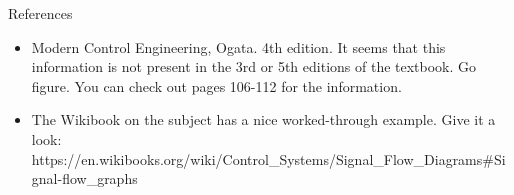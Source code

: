 \documentclass{../templates/topic}
\begin{document}
\begin{section}{References}
	\begin{itemize}
		\item Modern Control Engineering, Ogata. 4th edition. It seems that this information is not present in the 3rd or 5th editions of the textbook. Go figure. You can check out pages 106-112 for the information.
		\item The Wikibook on the subject has a nice worked-through example. Give it a look: https://en.wikibooks.org/wiki/Control_Systems/Signal_Flow_Diagrams#Signal-flow_graphs
	\end{itemize}
	
\end{section}
\end{document}
